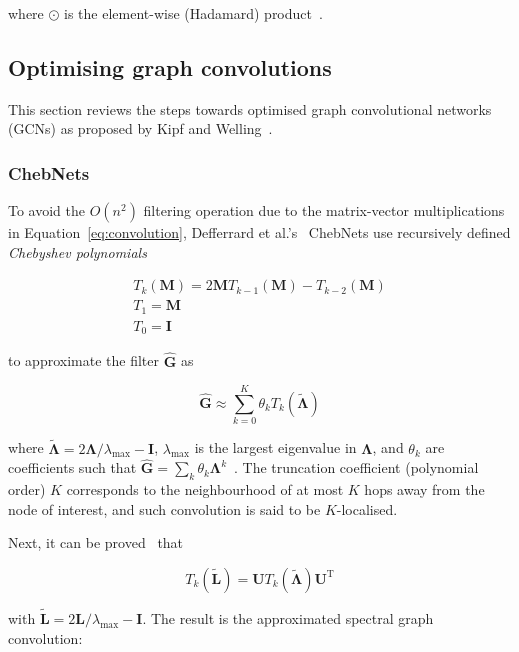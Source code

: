 where $\odot$ is the element-wise (Hadamard) product~\cite{wu2019simplifying}.

\subsection{Optimising graph convolutions}
This section reviews the steps towards optimised graph convolutional networks (GCNs) as proposed by Kipf and Welling~\cite{kipf2017semi}.

\subsubsection{ChebNets}
To avoid the $O(n^2)$ filtering operation due to the matrix-vector multiplications in Equation~\eqref{eq:convolution}, Defferrard et al.'s~\cite{defferrard2016convolutional} ChebNets use recursively defined \textit{Chebyshev polynomials}

\begin{gather}
    T_k(\mathbf{M}) = 2\mathbf{M}T_{k-1}(\mathbf{M}) - T_{k-2}(\mathbf{M}) \\
    T_1 = \mathbf{M} \\
    T_0 = \mathbf{I}
\end{gather}

to approximate the filter $\mathbf{\hat{G}}$ as 

\begin{equation}
    \mathbf{\hat{G}} \approx \sum_{k = 0}^{K} \theta_k T_k(\mathbf{\tilde{\Lambda}})
\end{equation}

where $\mathbf{\tilde{\Lambda}} = 2\mathbf{\Lambda}/\lambda_{\mathrm{max}} - \mathbf{I}$, $\lambda_\mathrm{max}$ is the largest eigenvalue in $\mathbf{\Lambda}$, and $\theta_k$ are coefficients such that $\mathbf{\hat{G}} = \sum_k \theta_k \mathbf{\Lambda}^k$~\cite{wu2019simplifying}. The truncation coefficient (polynomial order) $K$ corresponds to the neighbourhood of at most $K$ hops away from the node of interest, and such convolution is said to be $K$-localised. 

Next, it can be proved~\cite{wu2019comprehensive} that

\begin{equation}
    T_k(\mathbf{\tilde{L}}) = \mathbf{U}T_k(\mathbf{\tilde{\Lambda}})\mathbf{U}^{\mathrm{T}}
\end{equation}

with $\mathbf{\tilde{L}} = 2\mathbf{L}/\lambda_{\mathrm{max}} - \mathbf{I}$. The result is the approximated spectral graph convolution:


